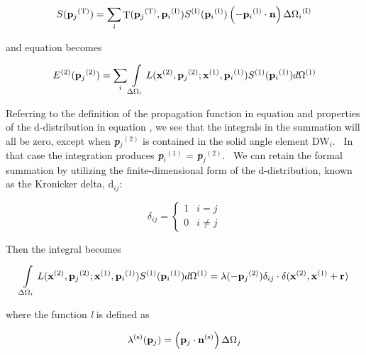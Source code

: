 \begin{equation}
S({{\bf{p}}_j}^{{\rm{(T)}}}) = \sum\limits_i {{\mathop{\rm T}\nolimits} ({{\bf{p}}_j}^{{\rm{(T)}}},{{\bf{p}}_i}^{{\rm{(I)}}}){S^{{\rm{(I)}}}}({{\bf{p}}_i}^{{\rm{(I)}}})\left( { - {{\bf{p}}_i}^{{\rm{(I)}}}\cdot {\bf{n}}} \right)\Delta {\Omega_i}^{{\rm{(I)}}}}
\end{equation}

and equation becomes

\begin{equation}
{E^{(2)}}({{\bf{p}}_j}^{{\rm{(2)}}}) = \sum\limits_i {\int\limits_{\Delta {\Omega_i}} {L({{\bf{x}}^{{\rm{(2)}}}},{{\bf{p}}_j}^{{\rm{(2)}}};{{\bf{x}}^{{\rm{(1)}}}},{{\bf{p}}_i}^{{\rm{(1)}}}){S^{{\rm{(1)}}}}({{\bf{p}}_i}^{{\rm{(1)}}})d{\Omega ^{{\rm{(1)}}}}} }
\end{equation}

Referring to the definition of the propagation function in equation and properties of the d-distribution in equation , we see that the integrals in the summation will all be zero, except when \textbf{\emph{p}}\emph{\(_{j}\)}\(^{(2)}\) is contained in the solid angle element DW\emph{\(_{i}\)}.~ In that case the integration produces \textbf{\emph{p}}\emph{\(_{i}\)}\(^{(1)}\) = \textbf{\emph{p}}\emph{\(_{j}\)}\(^{(2)}\).~ We can retain the formal summation by utilizing the finite-dimensional form of the d-distribution, known as the Kronicker delta, d\emph{\(_{ij}\)}:

\begin{equation}
{\delta_{ij}} = \left\{ {\begin{array}{*{20}{c}}1&{i = j}\\0&{i \ne j}\end{array}} \right.
\end{equation}

Then the integral becomes

\begin{equation}
\int\limits_{\Delta {\Omega_i}} {L({{\bf{x}}^{{\rm{(2)}}}},{{\bf{p}}_j}^{{\rm{(2)}}};{{\bf{x}}^{{\rm{(1)}}}},{{\bf{p}}_i}^{{\rm{(1)}}}){S^{{\rm{(1)}}}}({{\bf{p}}_i}^{{\rm{(1)}}})d{\Omega ^{{\rm{(1)}}}}}  = \lambda ( - {{\bf{p}}_j}^{{\rm{(2)}}}){\delta_{ij}} \cdot \delta ({{\bf{x}}^{{\rm{(2)}}}},{{\bf{x}}^{{\rm{(1)}}}} + {\bf{r}})
\end{equation}

where the function \emph{l} is defined as

\begin{equation}
{\lambda ^{{\rm{(s)}}}}({{\bf{p}}_j}) = \left( {{{\bf{p}}_j}\cdot {{\bf{n}}^{{\rm{(s)}}}}} \right)\Delta {\Omega_j}
\end{equation}

